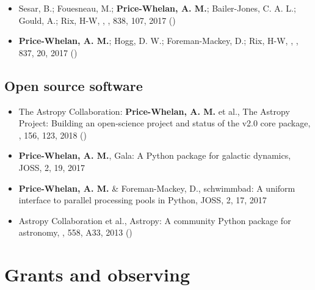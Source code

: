 \documentclass[12pt, letterpaper]{apw-cv}
\begin{document}
\begin{itemize}
\item Sesar, B.; Fouesneau, M.; {\bf Price-Whelan, A. M.}; Bailer-Jones, C. A. L.; Gould, A.; Rix, H-W,
    ,
    \apj, 838, 107, 2017 ()

\item {\bf Price-Whelan, A. M.}; Hogg, D. W.; Foreman-Mackey, D.; Rix, H-W,
    ,
    \apj, 837, 20, 2017 ()

    \end{itemize}

    \subsection*{Open source software}
    \begin{itemize}

\item The Astropy Collaboration: {\bf Price-Whelan, A. M.} et al.,
    {The Astropy Project: Building an open-science project and status of the v2.0 core package},
    \apj, 156, 123, 2018 ()

\item {\bf Price-Whelan, A. M.},
    {Gala: A Python package for galactic dynamics},
    JOSS, 2, 19, 2017

\item {\bf Price-Whelan, A. M.} \& Foreman-Mackey, D.,
    {schwimmbad: A uniform interface to parallel processing pools in Python},
    JOSS, 2, 17, 2017

\item Astropy Collaboration et al.,
    {Astropy: A community Python package for astronomy},
    \aanda, 558, A33, 2013 ()

	\end{itemize}

\section*{Grants and observing }
\end{document}
